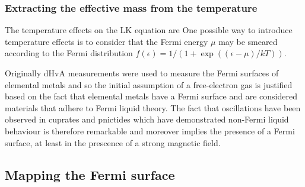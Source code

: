 \subsubsection{Extracting the effective mass from the temperature}

The temperature effects on the \ac{LK} equation are One possible way to introduce temperature effects is to consider that the Fermi energy $\mu$ may be smeared according to the Fermi distribution $f(\epsilon) = 1/(1+\exp((\epsilon-\mu)/kT))$.





Originally \ac{dHvA} measurements were used to measure the Fermi surfaces of elemental metals and so the initial assumption of a free-electron gas is justified based on the fact that elemental metals have a Fermi surface and are considered materials that adhere to Fermi liquid theory. The fact that oscillations have been observed in cuprates and pnictides which have demonstrated non-Fermi liquid behaviour is therefore remarkable and moreover implies the presence of a Fermi surface, at least in the prescence of a strong magnetic field.



\subsection{Mapping the Fermi surface}

